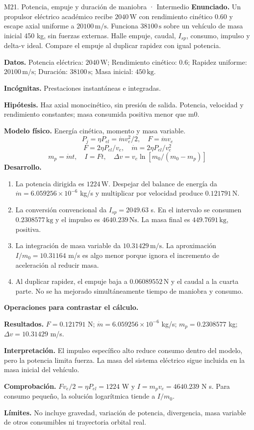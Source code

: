 \begin{studiumworked}{M21. Potencia, empuje y duración de maniobra · Intermedio}
\textbf{Enunciado.} Un propulsor eléctrico académico recibe $2040\,\mathrm{W}$ con rendimiento cinético 0.60 y escape axial uniforme a $20100\,\mathrm{m/s}$. Funciona $38100\,\mathrm{s}$ sobre un vehículo de masa inicial 450 kg, sin fuerzas externas. Halle empuje, caudal, $I_{sp}$, consumo, impulso y delta-v ideal. Compare el empuje al duplicar rapidez con igual potencia.

\textbf{Datos.} Potencia eléctrica: $2040\,\mathrm{W}$; Rendimiento cinético: $0.6$; Rapidez uniforme: $20100\,\mathrm{m/s}$; Duración: $38100\,\mathrm{s}$; Masa inicial: $450\,\mathrm{kg}$.

\textbf{Incógnitas.} Prestaciones instantáneas e integradas.

\textbf{Hipótesis.} Haz axial monocinético, sin presión de salida. Potencia, velocidad y rendimiento constantes; masa consumida positiva menor que m0.

\textbf{Modelo físico.} Energía cinética, momento y masa variable.
\[P_j=\eta P_{el}=\dot m v_e^2/2,\quad F=\dot m v_e\]
\[F=2\eta P_{el}/v_e,\quad \dot m=2\eta P_{el}/v_e^2\]
\[m_p=\dot mt,\quad I=Ft,\quad \Delta v=v_e\ln[m_0/(m_0-m_p)]\]
\textbf{Desarrollo.}
\begin{enumerate}
\item La potencia dirigida es $1224\,\mathrm{W}$. Despejar del balance de energía da $\dot m=6.059256\times10^{-6}$ kg/s y multiplicar por velocidad produce $0.121791\,\mathrm{N}$.
\item La conversión convencional da $I_{sp}=2049.63$ s. En el intervalo se consumen $0.2308577\,\mathrm{kg}$ y el impulso es $4640.239\,\mathrm{N s}$. La masa final es $449.7691\,\mathrm{kg}$, positiva.
\item La integración de masa variable da $10.31429\,\mathrm{m/s}$. La aproximación $I/m_0=10.31164$ m/s es algo menor porque ignora el incremento de aceleración al reducir masa.
\item Al duplicar rapidez, el empuje baja a $0.06089552\,\mathrm{N}$ y el caudal a la cuarta parte. No se ha mejorado simultáneamente tiempo de maniobra y consumo.
\end{enumerate}
\textbf{Operaciones para contrastar el cálculo.}

\textbf{Resultados.} $F=0.121791$ N; $\dot m=6.059256\times10^{-6}$ kg/s; $m_p=0.2308577$ kg; $\Delta v=10.31429$ m/s.

\textbf{Interpretación.} El impulso específico alto reduce consumo dentro del modelo, pero la potencia limita fuerza. La masa del sistema eléctrico sigue incluida en la masa inicial del vehículo.

\textbf{Comprobación.} $Fv_e/2=\eta P_{el}=1224$ W y $I=m_pv_e=4640.239$ N s. Para consumo pequeño, la solución logarítmica tiende a $I/m_0$.

\textbf{Límites.} No incluye gravedad, variación de potencia, divergencia, masa variable de otros consumibles ni trayectoria orbital real.
\end{studiumworked}
